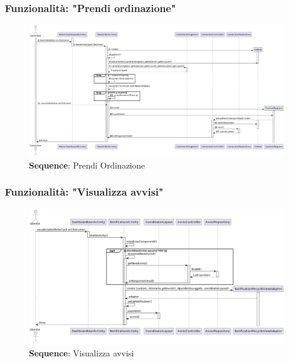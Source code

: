 \subsubsection{Funzionalità: "Prendi ordinazione"}
    \begin{figure}[H]
        \centering
        \includegraphics[scale=0.2]{assets/diagrammi/Sequence di design/Take Order.png}
        \caption{\textbf{Sequence}: Prendi Ordinazione}\label{fig:seq_take_order}
    \end{figure}

\subsubsection{Funzionalità: "Visualizza avvisi"}
    \begin{figure}[H]
        \centering
        \includegraphics[scale=0.4]{assets/diagrammi/Sequence di design/Visualizza avvisi.png}
        \caption{\textbf{Sequence}: Visualizza avvisi}\label{fig:seq_view_avvisi}
    \end{figure}

\newpage